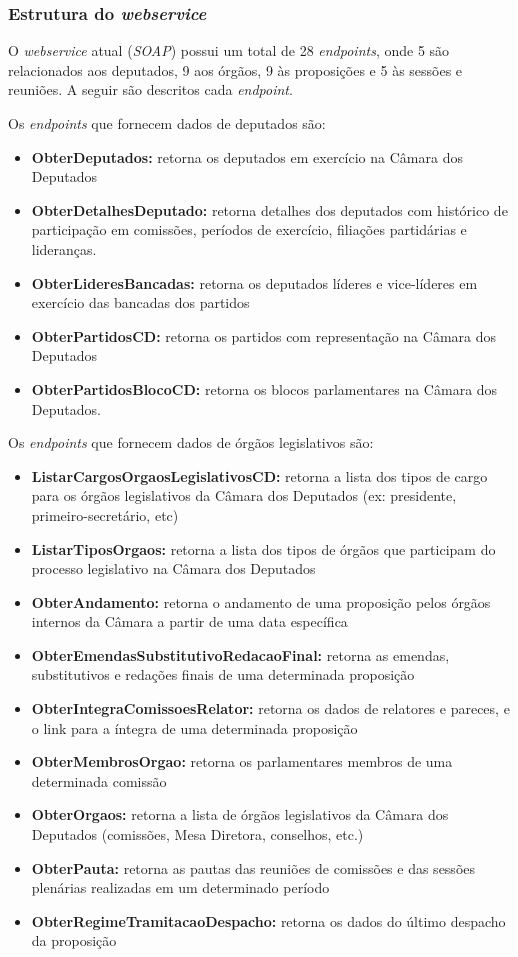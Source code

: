 \subsubsection{Estrutura do \textit{webservice}}

O \textit{webservice} atual (\textit{SOAP}) possui um total de 28 \textit{endpoints}, onde 5 são relacionados aos deputados, 9 aos órgãos, 9 às proposições e 5 às sessões e reuniões. A seguir são descritos cada \textit{endpoint}.

Os \textit{endpoints} que fornecem dados de deputados são:
\begin{itemize}
    \item \textbf{ObterDeputados:} retorna os deputados em exercício na Câmara dos Deputados
    \item \textbf{ObterDetalhesDeputado:} retorna detalhes dos deputados com histórico de participação em comissões, períodos de exercício, filiações partidárias e lideranças.
    \item \textbf{ObterLideresBancadas:} retorna os deputados líderes e vice-líderes em exercício das bancadas dos partidos
    \item \textbf{ObterPartidosCD:} retorna os partidos com representação na Câmara dos Deputados
    \item \textbf{ObterPartidosBlocoCD:} retorna os blocos parlamentares na Câmara dos Deputados.
\end{itemize}

Os \textit{endpoints} que fornecem dados de órgãos legislativos são:

\begin{itemize}
    \item \textbf{ListarCargosOrgaosLegislativosCD:} retorna a lista dos tipos de cargo para os órgãos legislativos da Câmara dos Deputados (ex: presidente, primeiro-secretário, etc)
    \item \textbf{ListarTiposOrgaos:} retorna a lista dos tipos de órgãos que participam do processo legislativo na Câmara dos Deputados
    \item \textbf{ObterAndamento:} retorna o andamento de uma proposição pelos órgãos internos da Câmara a partir de uma data específica
    \item \textbf{ObterEmendasSubstitutivoRedacaoFinal:} retorna as emendas, substitutivos e redações finais de uma determinada proposição
    \item \textbf{ObterIntegraComissoesRelator:} retorna os dados de relatores e pareces, e o link para a íntegra de uma determinada proposição
    \item \textbf{ObterMembrosOrgao:} retorna os parlamentares membros de uma determinada comissão
    \item \textbf{ObterOrgaos:} retorna a lista de órgãos legislativos da Câmara dos Deputados (comissões, Mesa Diretora, conselhos, etc.)
    \item \textbf{ObterPauta:} retorna as pautas das reuniões de comissões e das sessões plenárias realizadas em um determinado período
    \item \textbf{ObterRegimeTramitacaoDespacho:} retorna os dados do último despacho da proposição
\end{itemize}

